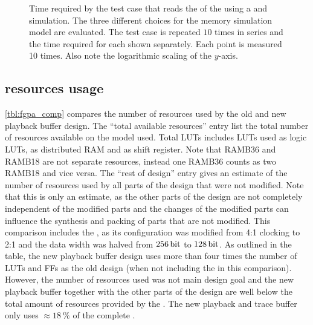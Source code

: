 \begin{figure}
\caption{Time required by the \hxcomm{} test case that reads the \JTAGID{} of the \ASIC{} using a \FPGA{} and \ASIC{} simulation. The three different choices for the \AXI{} \DDR{} memory simulation model are evaluated. The \hxcomm{} test case is repeated $\num{10}$ times in series and the time required for each shown separately. Each point is measured 10 times. Also note the logarithmic scaling of the \(y\)-axis.}\label{fig:flange_perf}
\end{figure}

\subsection{\FPGA{} resources usage}
\autoref{tbl:fgpa_comp} compares the number of \FPGA{} resources used by the old and new playback buffer design. The ``total available resources'' entry list the total number of resources available on the \FPGA{} model used. Total LUTs includes LUTs used as logic LUTs, as distributed RAM and as shift register. Note that RAMB36 and RAMB18 are not separate resources, instead one RAMB36 counts as two RAMB18 and vice versa.
The ``rest of \FPGA{} design'' entry gives an estimate of the number of resources used by all parts of the \FPGA{} design that were not modified. Note that this is only an estimate, as the other parts of the design are not completely independent of the modified parts and the changes of the modified parts can influence the synthesis and packing of parts that are not modified.
This comparison includes the \XilinxMIG{}, as its configuration was modified from 4:1 clocking to 2:1 and the data width was halved from $\SI{256}{\bit}$ to $\SI{128}{\bit}$.
As outlined in the table, the new playback buffer design uses more than four times the number of LUTs and FFs as the old design (when not including the \MIG{} in this comparison). However, the number of resources used was not main design goal and the new playback buffer together with the other parts of the \FPGA{} design are well below the total amount of resources provided by the \FPGA{}. The new playback and trace buffer only uses $\approx\SI{18}{\percent}$ of the complete \FPGA{}.
